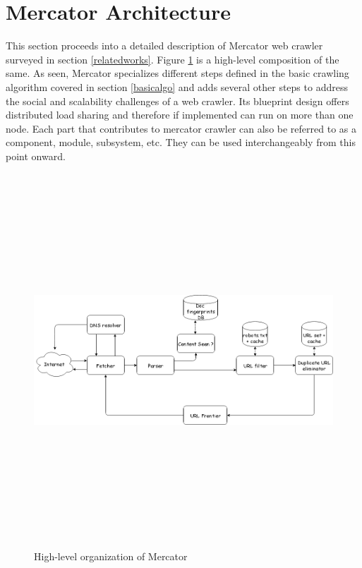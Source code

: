 \section{Mercator Architecture}\label{blueprint}
This section proceeds into a detailed description of Mercator\cite{mercator} web crawler surveyed in section \ref{relatedworks}. Figure \ref{fig:basicarch} is a high-level composition of the same. As seen, Mercator specializes different steps defined in the basic crawling
algorithm covered in section \ref{basicalgo} and adds several other steps to address
the social and scalability challenges of a web crawler. Its blueprint design offers
distributed load sharing and therefore if implemented can run on more than one node.
Each part that contributes to mercator crawler can also be referred to as a
component, module, subsystem, etc. They can be used interchangeably from this point onward.

\begin{figure}[h!]
  \centering
  \includegraphics[width=16cm,height=14cm,keepaspectratio]{../media/crawler/basic-crawler-architecture-v2.png}
  \caption{High-level organization of Mercator \cite{mercator}}
  \label{fig:basicarch}
\end{figure}

